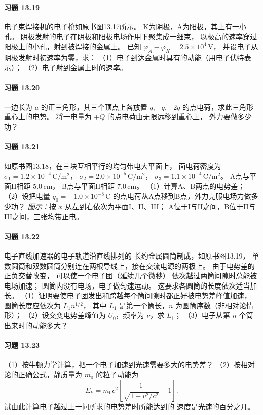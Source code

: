 \paragraph{习题 13.19}
电子束焊接机的电子枪如原书图13.17所示。
K为阴极，A为阳极，其上有一小孔。
阴极发射的电子在阴极和阳极电场作用下聚集成一细束，
以极高的速率穿过阳极上的小孔，射到被焊接的金属上。
已知 \(\varphi_A-\varphi_K=2.5\times10^4\,\mathrm V\)，
并设电子从阴极发射时初速率为零，求：
（1）电子到达金属时具有的动能（用电子伏特表示）；
（2）电子射到金属上时的速率。

\paragraph{习题 13.20}
一边长为 \(a\) 的正三角形，其三个顶点上各放置
\(q,-q,-2q\) 的点电荷，求此三角形重心上的电势。
将一电量为 \(+Q\) 的点电荷由无限远移到重心上，
外力要做多少功？

\paragraph{习题 13.21}
如原书图13.18，在三块互相平行的均匀带电大平面上，
面电荷密度为
\(\sigma_1=1.2\times10^{-4}\,\mathrm{C/m^2}\)，
\(\sigma_2=2.0\times10^{-5}\,\mathrm{C/m^2}\)，
\(\sigma_3=1.1\times10^{-4}\,\mathrm{C/m^2}\)。
A点与平面II相距 \(5.0\,\mathrm{cm}\)，
B点与平面II相距 \(7.0\,\mathrm{cm}\)。
（1）计算A、B两点的电势差；
（2）设把电量 \(q_0=-1.0\times10^{-8}\,\mathrm C\)
的点电荷从A点移到B点，外力克服电场力做多少功？
\textit{图示：}按 \(x\) 从左到右依次为平面I、II、III；
A位于I与II之间，B位于II与III之间，三张均带正电。

\paragraph{习题 13.22}
电子直线加速器的电子轨道沿直线排列的
长约金属圆筒制成，如原书图13.19，
单数圆筒和双数圆筒分别连在两根导线上，接在交流电源的两极上。
由于电势差的正负交替改变，
可以使一个电子团（延续几个微秒）
依次越过两筒间隙时总能被电场加速；
圆筒内没有电场，电子做匀速运动。
这要求各圆筒的长度依次适当加长。
（1）证明要使电子团发出和跨越每个筒间隙时都正好被电势差峰值加速，
圆筒长度应依次为 \(L_1n^{1/2}\)，
其中 \(L_1\) 是第一个筒长，\(n\) 为圆筒序数（非相对论情形）；
（2）设交变电势差峰值为 \(U_0\)，频率为 \(\nu\)，求 \(L_1\)；
（3）电子从第 \(n\) 个筒出来时的动能多大？

\paragraph{习题 13.23}
（1）按牛顿力学计算，把一个电子加速到光速需要多大的电势差？
（2）按相对论的正确公式，静质量为 \(m_0\) 的粒子动能为
\[
 E_k=m_0c^2\left[\frac1{\sqrt{1-v^2/c^2}}-1\right].
\]
试由此计算电子越过上一问所求的电势差时所能达到的
速度是光速的百分之几。

